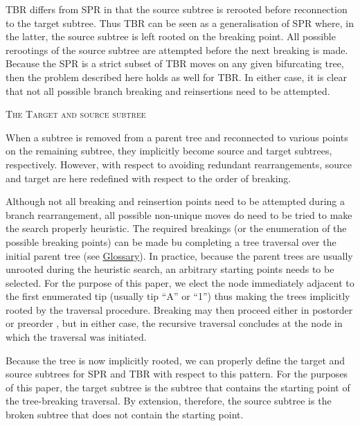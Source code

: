 \documentclass[12pt,letterpaper]{article}
\renewcommand{\section}[1]{%
\bigskip
\begin{center}
\begin{Large}
\normalfont\scshape #1
\medskip
\end{Large}
\end{center}}
\begin{document}
TBR differs from SPR in that the source subtree is rerooted before reconnection to the target subtree.
Thus TBR can be seen as a generalisation of SPR where, in the latter, the source subtree is left rooted on the breaking point.
All possible rerootings of the source subtree are attempted before the next breaking is made.
Because the SPR is a strict subset of TBR moves on any given bifurcating tree, then the problem described here holds as well for TBR.
In either case, it is clear that not all possible branch breaking and reinsertions need to be attempted.

\section{The Target and source subtree}
When a subtree is removed from a parent tree and reconnected to various points on the remaining subtree, they implicitly become source and target subtrees, respectively.
However, with respect to avoiding redundant rearrangements, source and target are here redefined with respect to the order of breaking.

Although not all breaking and reinsertion points need to be attempted during a branch rearrangement, all possible non-unique moves do need to be tried to make the search properly heuristic. 
The required breakings (or the enumeration of the possible breaking points) can be made bu completing a tree traversal over the initial parent tree (see \hyperref[Glossary]{Glossary}).
In practice, because the parent trees are usually unrooted during the heuristic search, an arbitrary starting points needs to be selected.
For the purpose of this paper, we elect the node immediately adjacent to the first enumerated tip (usually tip ``A'' or ``1'') thus making the trees implicitly rooted by the traversal procedure.
Breaking may then proceed either in postorder or preorder %
, but in either case, the recursive traversal concludes at the node in which the traversal was initiated.

Because the tree is now implicitly rooted, we can properly define the target and source subtrees for SPR and TBR with respect to this pattern.
For the purposes of this paper, the target subtree is the subtree that contains the starting point of the tree-breaking traversal.
By extension, therefore, the source subtree is the broken subtree that does not contain the starting point.
\end{document}
